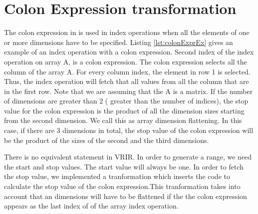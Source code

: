 \section{Colon Expression transformation}
\label{sec:colonExpr}
The colon expression in \matlab is used in index operations when all the elements of one or more dimensions have to be specified. Listing \ref{lst:colonExprEx} gives an example of an index operation with a colon expression. Second index of the index operation on array A, is a colon expression. The colon expression selects all the column of the array A. For every column index, the element in row 1 is selected. Thus, the index operation will fetch that all values from all the column that are in the first row. Note that we are assuming that the A is a matrix. If the number of dimensions are greater than 2 ( greater than the number of indices), the stop value for the colon expression is the product of all the dimension sizes starting from the second dimension. We call this as array dimension flattening. 
In this case, if there are 3 dimensions in total, the stop value of the colon expression will be the product of the sizes of the second and the third dimensions. 

There is no equivalent statement in VRIR. In order to generate a range, we need the start and stop values. The start value will always be one. In order to fetch the stop value, we implemented a tranformation which inserts the code to calculate the stop value of the colon expression.This tranformation takes into account that an dimensions will have to be flattened if the the colon expression appears as the last index of of the array index operation. 

